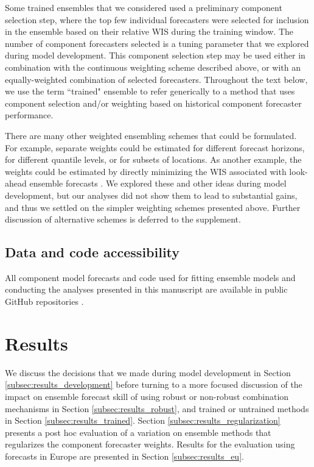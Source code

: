\documentclass[11pt,3p,authoryear]{elsarticle}
\begin{document}
Some trained ensembles that we considered used a preliminary component selection step, where the top few individual forecasters were selected for inclusion in the ensemble based on their relative WIS during the training window.
The number of component forecasters selected is a tuning parameter that we explored during model development.
This component selection step may be used either in combination with the continuous weighting scheme described above, or with an equally-weighted combination of selected forecasters.
Throughout the text below, we use the term ``trained" ensemble to refer generically to a method that uses component selection and/or weighting based on historical component forecaster performance.

There are many other weighted ensembling schemes that could be formulated. For example, separate weights could be estimated for different forecast horizons, for different quantile levels, or for subsets of locations. 
As another example, the weights could be estimated by directly minimizing the WIS associated with look-ahead ensemble forecasts \citep{taylor2021combiningForecastsCOVID}.
We explored these and other ideas during model development, but our analyses did not show them to lead to substantial gains, and thus we settled on the simpler weighting schemes presented above. Further discussion of alternative schemes is deferred to the supplement.

\subsection{Data and code accessibility}

All component model forecasts and code used for fitting ensemble models and conducting the analyses presented in this manuscript are available in public GitHub repositories \citep{cramer_reichlabcovid19-forecast-hub_2021, ray_reichlabcovidensembles_2020, ray_covid-19_ensemble_manuscript_2021}.

\section{Results}

We discuss the decisions that we made during model development in Section \ref{subsec:results_development} before turning to a more focused discussion of the impact on ensemble forecast skill of using robust or non-robust combination mechanisms in Section \ref{subsec:results_robust}, and trained or untrained methods in Section \ref{subsec:results_trained}.
Section \ref{subsec:results_regularization} presents a post hoc evaluation of a variation on ensemble methods that regularizes the component forecaster weights.
Results for the evaluation using forecasts in Europe are presented in Section \ref{subsec:results_eu}.
\end{document}
